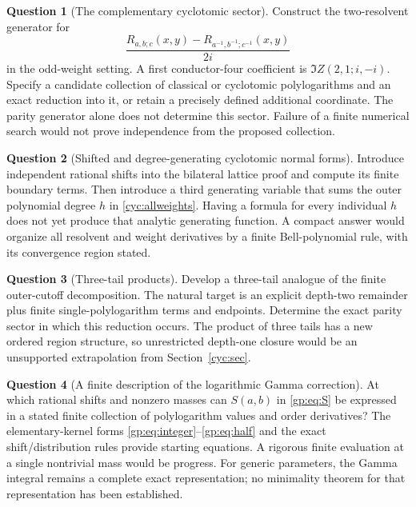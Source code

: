 \documentclass[11pt,a4paper]{article}
\numberwithin{equation}{section}
\theoremstyle{definition}
\newtheorem{question}{Question}
\theoremstyle{remark}
\begin{document}
\begin{question}[The complementary cyclotomic sector]
Construct the two-resolvent generator for
\[
 \frac{R_{a,b;c}(x,y)-R_{a^{-1},b^{-1};c^{-1}}(x,y)}{2i}
\]
in the odd-weight setting. A first conductor-four coefficient is
$\Im Z(2,1;i,-i)$. Specify a candidate collection of classical or
cyclotomic polylogarithms and an exact reduction into it, or retain a
precisely defined additional coordinate. The parity generator alone
does not determine this sector. Failure of a finite numerical search
would not prove independence from the proposed collection.
\end{question}

\begin{question}[Shifted and degree-generating cyclotomic normal forms]
Introduce independent rational shifts into the bilateral lattice proof
and compute its finite boundary terms. Then introduce a third generating
variable that sums the outer polynomial degree $h$ in
\eqref{cyc:allweights}. Having a formula for every individual $h$ does
not yet produce that analytic generating function. A compact answer
would organize all resolvent and weight derivatives by a finite
Bell-polynomial rule, with its convergence region stated.
\end{question}

\begin{question}[Three-tail products]
Develop a three-tail analogue of the finite outer-cutoff decomposition.
The natural target is an explicit depth-two remainder plus finite
single-polylogarithm terms and endpoints. Determine the exact parity
sector in which this reduction occurs. The product of three tails
has a new ordered region structure, so unrestricted depth-one closure
would be an unsupported extrapolation from Section~\ref{cyc:sec}.
\end{question}

\begin{question}[A finite description of the logarithmic Gamma correction]
At which rational shifts and nonzero masses can $S(a,b)$ in
\eqref{gp:eq:S} be expressed in a stated finite collection of
polylogarithm values and order derivatives? The elementary-kernel
forms \eqref{gp:eq:integer}--\eqref{gp:eq:half} and the exact
shift/distribution rules provide starting equations. A rigorous
finite evaluation at a single nontrivial mass would be progress.
For generic parameters, the Gamma integral remains a complete exact
representation; no minimality theorem for that representation has
been established.
\end{question}
\end{document}
